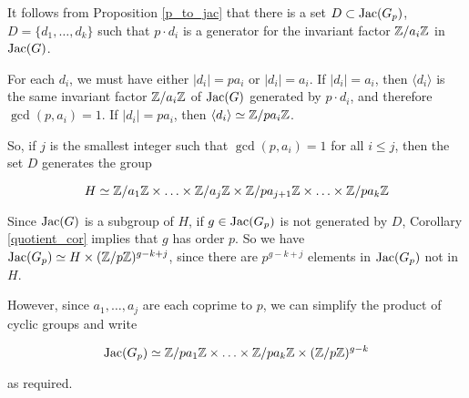 \documentclass{amsart}
\begin{document}
It follows from Proposition \ref{p_to_jac} that there is a set $D
\subset \operatorname{Jac}(G_p)$, $D = \{d_1, \ldots, d_k\}$ such that $p \cdot d_i$
is a generator for the invariant factor $\mathbb{Z}/a_i\mathbb{Z}$ in $\operatorname{Jac}(G)$.

For each $d_i$, we must have either $|d_i| = pa_i$ or $|d_i| =
a_i$. If $|d_i| = a_i$, then $\langle d_i \rangle$ is the same
invariant factor $\mathbb{Z}/a_i\mathbb{Z}$ of $\operatorname{Jac}(G)$ generated by $p \cdot d_i$,
and therefore $\gcd(p, a_i) = 1$. If $|d_i| = pa_i$, then $\langle d_i
\rangle \simeq \mathbb{Z}/pa_i\mathbb{Z}$.

So, if $j$ is the smallest integer such that $\gcd(p, a_i) = 1$ for
all $i \le j$, then the set $D$ generates the group

$$H \simeq \mathbb{Z}/a_1\mathbb{Z} \times \ldots \times \mathbb{Z}/a_j\mathbb{Z} \times \mathbb{Z}/pa_{j+1}\mathbb{Z} \times
\ldots \times \mathbb{Z}/pa_k\mathbb{Z}$$

Since $\operatorname{Jac}(G)$ is a subgroup of $H$, if $g \in \operatorname{Jac}(G_p)$ is not
generated by $D$, Corollary \ref{quotient_cor} implies that $g$ has
order $p$. So we have $\operatorname{Jac}(G_p) \simeq H \times (\mathbb{Z}/p\mathbb{Z})^{g-k+j}$,
since there are $p^{g-k+j}$ elements in $\operatorname{Jac}(G_p)$ not in $H$.

However, since $a_1, \ldots, a_j$ are each coprime to $p$, we can
simplify the product of cyclic groups and write

\begin{equation}
\operatorname{Jac}(G_p) \simeq \mathbb{Z}/pa_1\mathbb{Z} \times \ldots \times \mathbb{Z}/pa_k\mathbb{Z} \times (\mathbb{Z}/p\mathbb{Z})^{g-k}
\end{equation}

as required.
\end{document}
